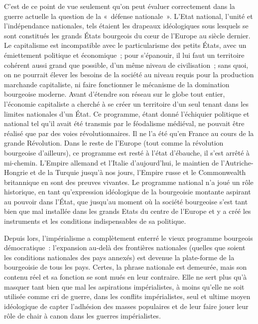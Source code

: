 \documentclass[french,twoside]{book} %
\begin{document}
C'est de ce point de vue seulement qu’on peut évaluer correctement dans la guerre actuelle la question de la « défense nationale ». L'Etat national, l’unité et l’indépendance nationales, tels étaient les drapeaux idéologiques sous lesquels se sont constitués les grands États bourgeois du cœur de l’Europe au siècle dernier. Le capitalisme est incompatible avec le particularisme des petits États, avec un émiettement politique et économique ; pour s’épanouir, il lui faut un territoire cohérent aussi grand que possible, d’un même niveau de civilisation ; sans quoi, on ne pourrait élever les besoins de la société au niveau requis pour la production marchande capitaliste, ni faire fonctionner le mécanisme de la domination bourgeoise moderne. Avant d’étendre son réseau sur le globe tout entier, l’économie capitaliste a cherché à se créer un territoire d’un seul tenant dans les limites nationales d’un État. Ce programme, étant donné l’échiquier politique et national tel qu’il avait été transmis par le féodalisme médiéval, ne pouvait être réalisé que par des voies révolutionnaires. Il ne l’a été qu’en France au cours de la grande Révolution. Dans le reste de l’Europe (tout comme la révolution bourgeoise d’ailleurs), ce programme est resté à l’état d’ébauche, il s’est arrêté à mi-chemin. L'Empire allemand et l’Italie d’aujourd’hui, le maintien de l’Autriche-Hongrie et de la Turquie jusqu’à nos jours, l’Empire russe et le Commonwealth britannique en sont des preuves vivantes. Le programme national n’a joué un rôle historique, en tant qu’expression idéologique de la bourgeoisie montante aspirant au pouvoir dans l’État, que jusqu’au moment où la société bourgeoise s’est tant bien que mal installée dans les grands Etats du centre de l’Europe et y a créé les instruments et les conditions indispensables de sa politique.\par
Depuis lors, l’impérialisme a complètement enterré le vieux programme bourgeois démocratique : l’expansion au-delà des frontières nationales (quelles que soient les conditions nationales des pays annexés) est devenue la plate-forme de la bourgeoisie de tous les pays. Certes, la phrase nationale est demeurée, mais son contenu réel et sa fonction se sont mués en leur contraire. Elle ne sert plus qu’à masquer tant bien que mal les aspirations impérialistes, à moins qu’elle ne soit utilisée comme cri de guerre, dans les conflits impérialistes, seul et ultime moyen idéologique de capter l’adhésion des masses populaires et de leur faire jouer leur rôle de chair à canon dans les guerres impérialistes.\par
\end{document}
